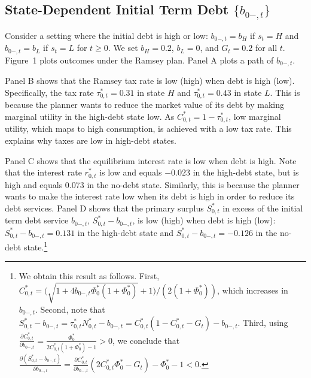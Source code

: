 \documentclass[12pt]{article}
\newcommand{\WJ}[1]{{\textcolor{red}{#1}}}
\begin{document}
\subsection{State-Dependent Initial Term Debt $\{b_{0-,t}\}$ } \label{subsec:b}


Consider a setting where the initial  debt is  high or low: $b_{0-,t} = b_H$ if $s_t=H$ and $b_{0-,t} = b_L$ if $s_t=L$ for $t \ge 0$. 
We set   $b_H = 0.2$, $b_L=0$, and  $G_t=0.2$ for all $t$. 
Figure~1 plots outcomes under the   Ramsey plan.  Panel A plots a  path of $b_{0-, t}$. 

Panel B shows that  the Ramsey tax rate is low (high) when debt is high (low). Specifically, the  tax rate $\tau_{0,t}^* = 0.31$ in state $H$ and  $\tau_{0,t}^* =0.43$ in state $L$.  
This is because the planner wants to reduce the market value of its debt by making marginal utility in the high-debt state low. As $C_{0,t}^* = 1-\tau_{0,t}^*$, low marginal utility, which maps to high consumption, is achieved with a low tax rate. This explains why taxes are low in high-debt states. 

Panel C shows that the  equilibrium interest rate is low  when debt is high. 
Note that  the interest rate $r_{0,t}^*$ is low and   equals $-0.023$ in the high-debt state, but is high and   equals %
$0.073$ in the no-debt state. Similarly, this is because the planner wants to make the interest rate low when its debt is high in order to reduce its debt services. %
Panel D shows that the primary surplus $S_{0,t}^\ast$ in excess of the initial term debt service $b_{0-,t}$,  $S_{0,t}^\ast-b_{0-,t}$, is low (high) when debt is high (low):   $S_{0,t}^*-b_{0-,t}= 0.131$ in the high-debt state and  $S_{0,t}^*-b_{0-,t}= -0.126$ in the no-debt state.\footnote{
We obtain this result as follows. First,    $C_{0,t}^* = \bigl(\sqrt{1+4b_{0-, t}\Phi_0^*(1+\Phi_0^*)}+1\bigr)/(2(1+\Phi_0^*))$, which increases in $b_{0-,t}$. 
Second, note that $S_{0,t}^*-b_{0-,t}=\tau_{0, t}^*N_{0, t}^*-b_{0-,t} = C_{0, t}^*(1-C_{0, t}^*-G_t)-b_{0-,t}$. Third,  using $\frac{\partial C_{0, t}^*}{\partial b_{0-, t}}=\frac{\Phi_0^*}{2C_{0, t}^*(1+\Phi_0^*)-1}>0$,  we conclude  that $\frac{\partial (S_{0,t}^*-b_{0-,t})}{\partial b_{0-, t}} = \frac{\partial C_{0, t}^*}{\partial b_{0-, t}}\left(2C_{0, t}^*\Phi_0^*-G_t \right)-\Phi_0^*-1 <0 $. 
} %
\end{document}
